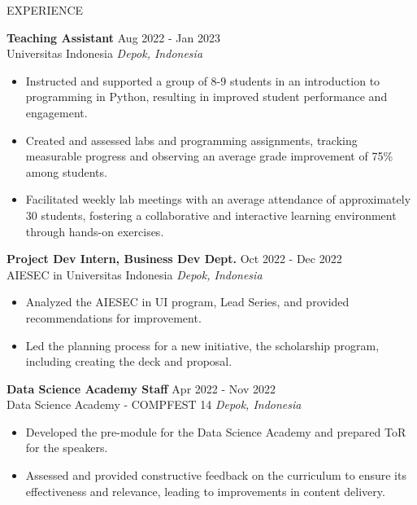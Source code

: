 \documentclass{resume} %
\begin{document}
\begin{rSection}{EXPERIENCE}

\textbf{Teaching Assistant} \hfill Aug 2022 - Jan 2023 \\
Universitas Indonesia \hfill \textit{Depok, Indonesia}
\vspace{-0.75em}
\begin{itemize}
\itemsep -7pt {}
\item Instructed and supported a group of 8-9 students in an introduction to programming in Python, resulting in improved student performance and engagement.
\item Created and assessed labs and programming assignments, tracking measurable progress and observing an average grade improvement of 75\% among students.
\item Facilitated weekly lab meetings with an average attendance of approximately 30 students, fostering a collaborative and interactive learning environment through hands-on exercises.
 \end{itemize}
 \vspace{-0.25em}

\textbf{Project Dev Intern, Business Dev Dept.} \hfill Oct 2022 - Dec 2022 \\
AIESEC in Universitas Indonesia \hfill \textit{Depok, Indonesia}
\vspace{-0.75em}
\begin{itemize}
\itemsep -7pt {}
\item Analyzed the AIESEC in UI program, Lead Series, and provided recommendations for improvement.
\item Led the planning process for a new initiative, the scholarship program, including creating the deck and proposal.
 \end{itemize}
 \vspace{-0.25em}

\textbf{Data Science Academy Staff} \hfill Apr 2022 - Nov 2022 \\
Data Science Academy - COMPFEST 14 \hfill \textit{Depok, Indonesia}
\vspace{-0.75em}
\begin{itemize}
\itemsep -7pt {}
\item Developed the pre-module for the Data Science Academy and prepared ToR for the speakers.
\item Assessed and provided constructive feedback on the curriculum to ensure its effectiveness and relevance, leading to improvements in content delivery.
 \end{itemize}
 \vspace{-0.25em}


\end{rSection} 
\end{document}
